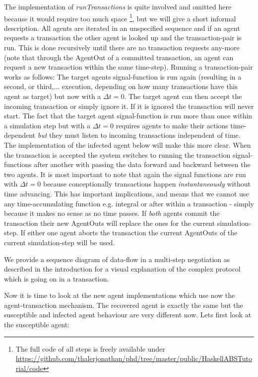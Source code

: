The implementation of \textit{runTransactions} is quite involved and omitted here because it would require too much space \footnote{The full code of all steps is freely available under \url{https://github.com/thalerjonathan/phd/tree/master/public/HaskellABSTutorial/code}}, but we will give a short informal description.
All agents are iterated in an unspecified sequence and if an agent requests a transaction the other agent is looked up and the transaction-pair is run. This is done recursively until there are no transaction requests any-more (note that through the AgentOut of a committed transaction, an agent can request a new transaction within the same time-step). Running a transaction-pair works as follows:
The target agents signal-function is run again (resulting in a second, or third,... execution, depending on how many transactions have this agent as target) but now with a $\Delta t = 0$. The target agent can then accept the incoming transaction or simply ignore it. If it is ignored the transaction will never start. The fact that the target agent signal-function is run more than once within a simulation step but with a $\Delta t = 0$ requires agents to make their actions time-dependent \textit{but} they must listen to incoming transactions independent of time. The implementation of the infected agent below will make this more clear.
When the transaction is accepted the system switches to running the transaction signal-functions after another with passing the data forward and backward between the two agents. It is most important to note that again the signal functions are run with $\Delta t = 0$ because conceptionally transactions happen \textit{instantaneously} without time advancing. This has important implications, and means that we cannot use any time-accumulating function e.g. integral or after within a transaction - simply because it makes no sense as no time passes. If \textit{both} agents commit the transaction their new AgentOuts will replace the ones for the current simulation-step. If either one agent aborts the transaction the current AgentOuts of the current simulation-step will be used.

We provide a sequence diagram of data-flow in a multi-step negotiation as described in the introduction for a visual explanation of the complex protocol which is going on in a transaction.

Now it is time to look at the new agent implementations which use now the agent-transaction mechanism. The recovered agent is exactly the same but the susceptible and infected agent behaviour are very different now. Lets first look at the susceptible agent:

